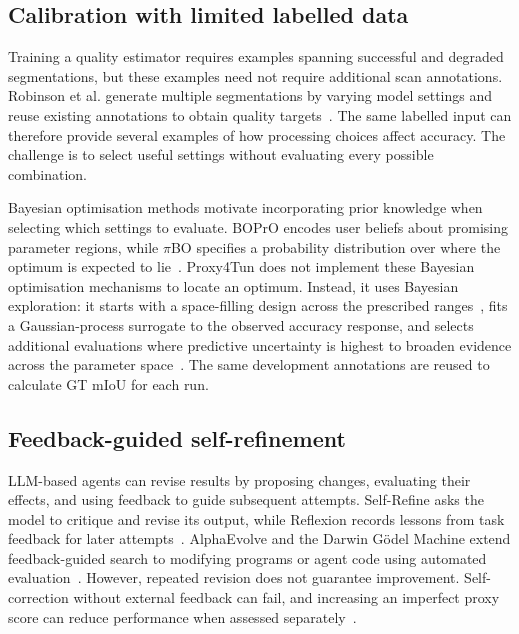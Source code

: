 \documentclass[a4paper,fleqn]{cas-dc}
\begin{document}
{\subsection{Calibration with limited labelled data}

Training a quality estimator requires examples spanning successful and degraded segmentations, but these examples need not require additional scan annotations. Robinson et al. generate multiple segmentations by varying model settings and reuse existing annotations to obtain quality targets~\cite{robinson2018segmentationQuality}. The same labelled input can therefore provide several examples of how processing choices affect accuracy. The challenge is to select useful settings without evaluating every possible combination.

Bayesian optimisation methods motivate incorporating prior knowledge when selecting which settings to evaluate. BOPrO encodes user beliefs about promising parameter regions, while $\pi$BO specifies a probability distribution over where the optimum is expected to lie~\cite{souza2020prior,hvarfner2022pibo}. Proxy4Tun does not implement these Bayesian optimisation mechanisms to locate an optimum. Instead, it uses Bayesian exploration: it starts with a space-filling design across the prescribed ranges~\cite{joe2008constructing}, fits a Gaussian-process surrogate to the observed accuracy response, and selects additional evaluations where predictive uncertainty is highest to broaden evidence across the parameter space~\cite{gramacy2009adaptive,gramacy2020surrogates}. The same development annotations are reused to calculate GT mIoU for each run.

\subsection{Feedback-guided self-refinement}

LLM-based agents can revise results by proposing changes, evaluating their effects, and using feedback to guide subsequent attempts. Self-Refine asks the model to critique and revise its output, while Reflexion records lessons from task feedback for later attempts~\cite{madaan2023selfrefine,shinn2023reflexion}. AlphaEvolve and the Darwin G\"odel Machine extend feedback-guided search to modifying programs or agent code using automated evaluation~\cite{novikov2025alphaevolve,zhang2025darwin}. However, repeated revision does not guarantee improvement. Self-correction without external feedback can fail, and increasing an imperfect proxy score can reduce performance when assessed separately~\cite{huang2024selfcorrect,gao2023overoptimization}.

}
\end{document}
